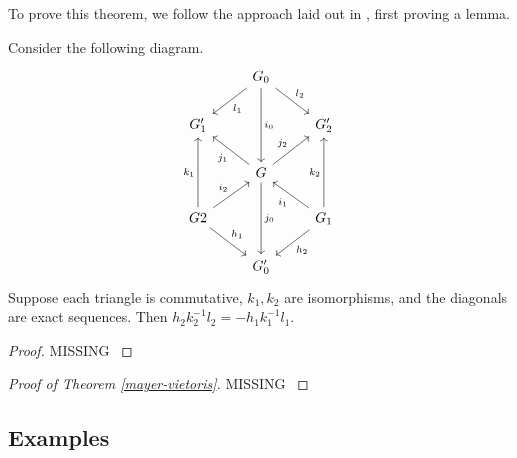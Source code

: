 To prove this theorem, we follow the approach laid out in \cite{Eilenberg}, first proving a lemma. 

\begin{lemma}
Consider the following diagram.
\[\begin{tikzcd}
                                                         & G_0 \arrow[ld, "l_1"] \arrow[rd, "l_2"] \arrow[dd, "i_0"] &                                                           \\
G_1'                                                     &                                                           & G_2'                                                      \\
                                                         & G \arrow[dd, "j_0"] \arrow[lu, "j_1"] \arrow[ru, "j_2"]   &                                                           \\
G2 \arrow[rd, "h_1"] \arrow[ru, "i_2"] \arrow[uu, "k_1"] &                                                           & G_1 \arrow[ld, "h_2"] \arrow[lu, "i_1"] \arrow[uu, "k_2"] \\
                                                         & G_0'                                                      &                                                          
\end{tikzcd}\]
Suppose each triangle is commutative, $k_1,k_2$ are isomorphisms, and the diagonals are exact sequences. Then $h_2k_2^{-1}l_2=-h_1k_1^{-1}l_1$.
\end{lemma}

\begin{proof}
MISSING
\cite{Eilenberg}
\end{proof}


\begin{proof}[Proof of Theorem \ref{mayer-vietoris}]

MISSING \cite{Eilenberg}
\end{proof}
\subsection{Examples}

